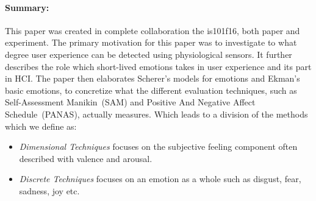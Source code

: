 \paragraph{Summary:}

This paper was created in complete collaboration the is101f16, both paper and experiment.
The primary motivation for this paper was to investigate to what degree user experience can be detected using physiological sensors.
It further describes the role which short-lived emotions takes in user experience and its part in HCI.
The paper then elaborates Scherer's\cite{definition_emotions} models for emotions and Ekman's basic emotions\cite{basic_emotion_origin}, to concretize what the different evaluation techniques, such as Self-Assessment Manikin~(SAM) and Positive And Negative Affect Schedule~(PANAS)\cite{PANAS}, actually measures. Which leads to a division of the methods which we define as:
\begin{itemize}
\item \textit{Dimensional Techniques} focuses on the subjective feeling component often described with valence and arousal.
\item \textit{Discrete Techniques} focuses on an emotion as a whole such as disgust, fear, sadness, joy etc.
\end{itemize}
